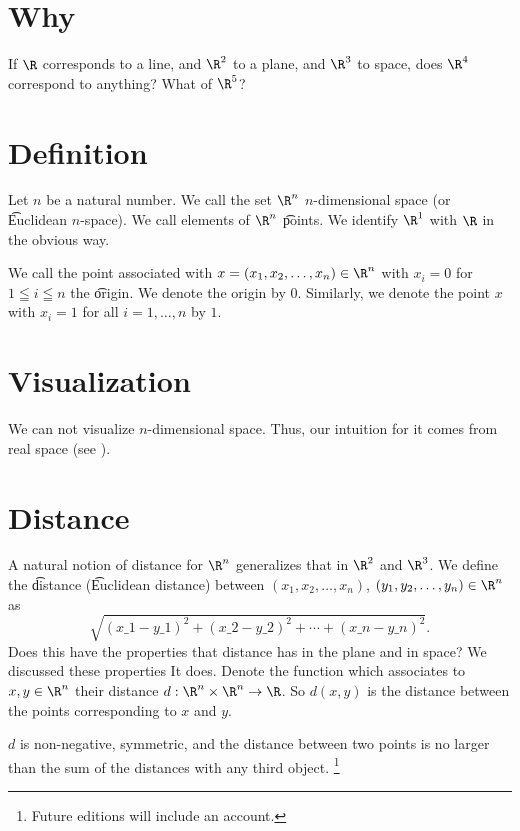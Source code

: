 
\section*{Why}

If $\R $ corresponds to a line, and $\R ^2$ to a plane, and $\R ^3$ to space, does $\R ^4$ correspond to anything? What of $\R ^5$?

\section*{Definition}

Let $n$ be a natural number.
We call the set $\R ^n$ \t{$n$-dimensional space} (or \t{Euclidean $n$-space}).
We call elements of $\R ^n$ \t{points}.
We identify $\R ^1$ with $\R $ in the obvious way.

We call the point associated with $x = (x_1, x_2, \dots , x_n) \in \R ^n$ with $x_i = 0$ for $1 \leqq i \leqq n$ the \t{origin}.
We denote the origin by $0$.
Similarly, we denote the point $x$ with $x_i = 1$ for all $i = 1, \dots , n$ by $1$.

\section*{Visualization}

We can not visualize $n$-dimensional space.
Thus, our intuition for it comes from real space (see ).

\section*{Distance}

A natural notion of distance for $\R ^n$ generalizes that in $\R ^2$ and $\R ^3$.
We define the \t{distance} (\t{Euclidean distance}) between $(x_1, x_2, \dots , x_n)$, $(y_1, y_2, \dots , y_n) \in \R ^n$ as
  \[
\sqrt{(x\_1 - y\_1)^2 + (x\_2 - y\_2)^2 + \cdots + (x\_n - y\_n)^2}.
  \]
Does this have the properties that distance has in the plane and in space?
We discussed these properties
It does.
Denote the function which associates to $x, y \in \R ^n$ their distance $d: \R ^n \times  \R ^n \to \R $.
So $d(x, y)$ is the distance between the points corresponding to $x$ and $y$.

\begin{proposition}$d$ is non-negative, symmetric, and the distance between two points is no larger than the sum of the distances with any third object.
\ifhmode\unskip\fi\footnote{
Future editions will include an account.
}\end{proposition}
